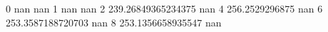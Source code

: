 0 nan nan
1 nan nan
2 239.26849365234375 nan
4 256.2529296875 nan
6 253.3587188720703 nan
8 253.1356658935547 nan
